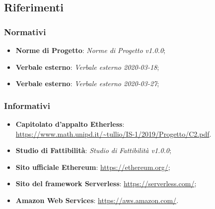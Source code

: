 \subsection{Riferimenti}
\subsubsection{Normativi}
\begin{itemize}
	\item \textbf{Norme di Progetto}: \textit{Norme di Progetto v1.0.0};
	\item \textbf{Verbale esterno}: \textit{Verbale esterno 2020-03-18};
	\item \textbf{Verbale esterno}: \textit{Verbale esterno 2020-03-27};
\end{itemize}

\subsubsection{Informativi}
\begin{itemize}
	\item \textbf{Capitolato d'appalto Etherless}:\\\url{https://www.math.unipd.it/~tullio/IS-1/2019/Progetto/C2.pdf}.
	\item \textbf{Studio di Fattibilità}: \textit{Studio di Fattibilità v1.0.0};
	\item \textbf{Sito ufficiale Ethereum}: \url{https://ethereum.org/};
	\item \textbf{Sito del framework Serverless}: \url{https://serverless.com/};
	\item \textbf{Amazon Web Services}: \url{https://aws.amazon.com/}.
\end{itemize}